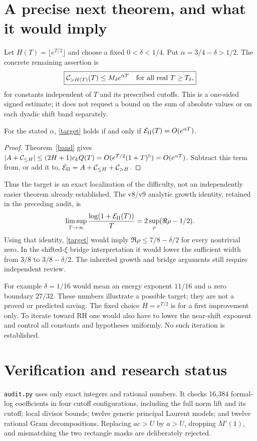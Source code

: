 \documentclass[11pt]{article}
\begin{document}
\section{A precise next theorem, and what it would imply}
Let $H(T)=\lfloor e^{T/2}\rfloor$ and choose a fixed
$0<\delta<1/4$. Put $\alpha=3/4-\delta>1/2$.
The concrete remaining assertion is
\begin{equation}\label{target}
 \boxed{\mathcal C_{>H(T)}(T)\le M_\delta e^{\alpha T}
 \quad\text{for all real }T\ge T_\delta,}
\end{equation}
for constants independent of $T$ and its prescribed cutoffs.
This is a one-sided signed estimate; it does not request a bound on
the sum of absolute values or on each dyadic shift band separately.

\begin{proposition}
For the stated $\alpha$, \eqref{target} holds if and only if
$\mathcal E_{\rm II}(T)=O(e^{\alpha T})$.
\end{proposition}
\begin{proof}
Theorem~\ref{band} gives
$|A+\mathcal C_{\le H}|\le(2H+1)c_kQ(T)
=O(e^{T/2}(1+T)^5)=O(e^{\alpha T})$.
Subtract this term from, or add it to,
$\mathcal E_{\rm II}=A+\mathcal C_{\le H}+\mathcal C_{>H}$.
\end{proof}
Thus the target is an exact localization of the difficulty, not an
independently easier theorem already established. The v8/v9 analytic
growth identity, retained in the preceding audit, is
\[
 \limsup_{T\to\infty}\frac{\log(1+\mathcal E_{\rm II}(T))}{T}
       =2\sup_\rho(\Re\rho-1/2).
\]
Using that identity, \eqref{target} would imply
$\Re\rho\le7/8-\delta/2$ for every nontrivial zero.
In the shifted-$\xi$ bridge interpretation it would lower the sufficient
width from $3/8$ to $3/8-\delta/2$.
The inherited growth and bridge arguments still require independent review.

For example $\delta=1/16$ would mean an energy exponent $11/16$ and
a zero boundary $27/32$. These numbers illustrate a possible target;
they are not a proved or predicted saving. The fixed choice
$H=e^{T/2}$ is for a first improvement only. To iterate toward RH one
would also have to lower the near-shift exponent and control all
constants and hypotheses uniformly. No such iteration is established.

\section{Verification and research status}
\texttt{audit.py} uses only exact integers and rational numbers. It checks
16,384 formal-log coefficients in four cutoff configurations, including
the full norm lift and its cutoff; local divisor bounds; twelve generic
principal Laurent models; and twelve rational Gram decompositions.
Replacing $ac>U$ by $a>U$, dropping $M'(1)$, and mismatching the two
rectangle masks are deliberately rejected.
\end{document}
